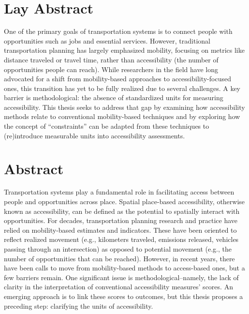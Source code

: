 \documentclass[
11pt, %
oneside, %
english, %
singlespacing, %
]{macthesis} %
\def\blankpage{%
      \clearpage%
      \thispagestyle{empty}%
      \addtocounter{page}{-1}%
      \null%
      \clearpage}
\begin{document}
\section*{Lay Abstract}
  One of the primary goals of transportation systems is to connect people with opportunities such as jobs and essential services. However, traditional transportation planning has largely emphasized mobility, focusing on metrics like distance traveled or travel time, rather than accessibility (the number of opportunities people can reach). While researchers in the field have long advocated for a shift from mobility-based approaches to accessibility-focused ones, this transition has yet to be fully realized due to several challenges. A key barrier is methodological: the absence of standardized units for measuring accessibility. This thesis seeks to address that gap by examining how accessibility methods relate to conventional mobility-based techniques and by exploring how the concept of ``constraints'' can be adapted from these techniques to (re)introduce measurable units into accessibility assessments.
\blankpage
\clearpage



\section*{\Huge Abstract}
\addchaptertocentry{\abstractname}
Transportation systems play a fundamental role in facilitating access between people and opportunities across place. Spatial place-based accessibility, otherwise known as accessibility, can be defined as the potential to spatially interact with opportunities. For decades, transportation planning research and practice have relied on mobility-based estimates and indicators. These have been oriented to reflect realized movement (e.g., kilometers traveled, emissions released, vehicles passing through an intersection) as opposed to potential movement (e.g., the number of opportunities that can be reached). However, in recent years, there have been calls to move from mobility-based methods to access-based ones, but a few barriers remain. One significant issue is methodological--namely, the lack of clarity in the interpretation of conventional accessibility measures' scores. An emerging approach is to link these scores to outcomes, but this thesis proposes a preceding step: clarifying the units of accessibility.
\end{document}
